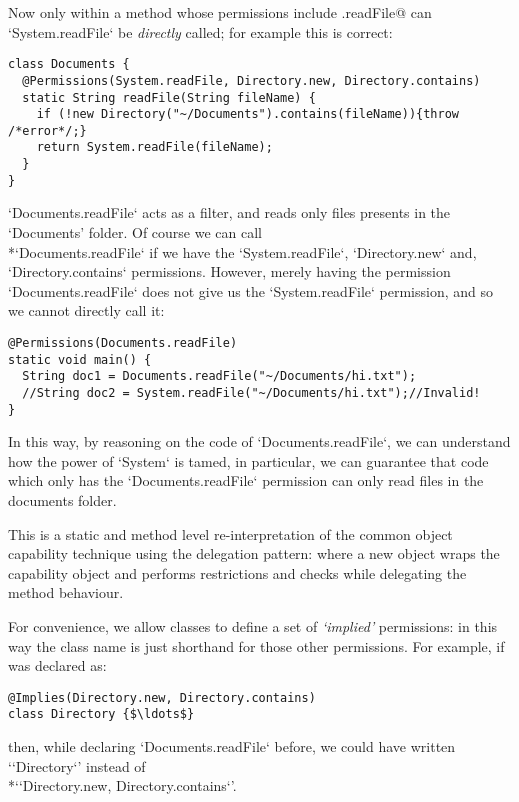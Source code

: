 \documentclass[a4paper,twoside,british,9pt]{extarticle}
\providecommand*{\code}[1]{\Q`#1`}
\begin{document}
Now only within a method whose permissions include \Q@System.readFile@
can \code{System.readFile} be \emph{directly} called; for example this
is correct:
\vspace{-1ex}
\begin{lstlisting}
class Documents {
  @Permissions(System.readFile, Directory.new, Directory.contains)
  static String readFile(String fileName) {
    if (!new Directory("~/Documents").contains(fileName)){throw /*error*/;}
    return System.readFile(fileName);
  }
}
\end{lstlisting}
\vspace{-1ex}
\code{Documents.readFile} acts as a filter, and reads only files
presents in the `Documents' folder. Of course we can call \\*\code{Documents.readFile}
if we have the \code{System.readFile}, \code{Directory.new} and,
\code{Directory.contains} permissions. However, merely having the
permission \code{Documents.readFile} does not give us the  \code{System.readFile}
permission, and so we cannot directly call it:
\vspace{-1ex}
\begin{lstlisting}
@Permissions(Documents.readFile)
static void main() {
  String doc1 = Documents.readFile("~/Documents/hi.txt");
  //String doc2 = System.readFile("~/Documents/hi.txt");//Invalid!
}
\end{lstlisting}
\vspace{-1ex}
In this way, by reasoning on the code of \code{Documents.readFile},
we can understand how the power of \code{System} is tamed, in particular,
we can guarantee that code which  only has the \code{Documents.readFile}
permission can only read files in the documents folder.

This is a static and method level re-interpretation of the common object capability technique
using the delegation pattern: where a new object wraps
the capability object and performs restrictions and checks while delegating the method behaviour.


For convenience, we allow classes to define a set of \emph{`implied'}
permissions: in this way the class name is just shorthand for those
other permissions. For example, if \Q@Directory@ was declared as:
\vspace{-1ex}
\begin{lstlisting}
@Implies(Directory.new, Directory.contains)
class Directory {$\ldots$}
\end{lstlisting}
\vspace{-1ex}
then, while declaring \code{Documents.readFile} before, we could
have written `\code{Directory}' instead of \\*`\code{Directory.new, Directory.contains}'.
\end{document}
